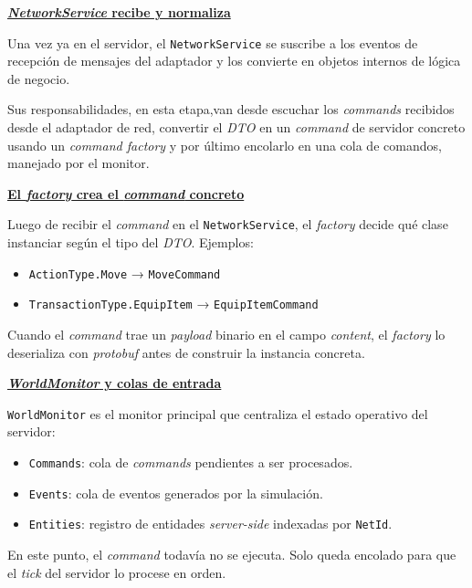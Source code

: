 \vspace{0.20cm}

\textbf{\underline{\textit{NetworkService} recibe y normaliza}}

\vspace{0.15cm}

Una vez ya en el servidor, el \texttt{NetworkService} se suscribe a los eventos de recepción de mensajes del adaptador y los 
convierte en objetos internos de lógica de negocio. 

Sus responsabilidades, en esta etapa,van desde escuchar los 
\textit{commands} recibidos desde el adaptador de red, convertir el \textit{DTO} en un \textit{command} de servidor 
concreto usando un \textit{command factory} y por último encolarlo en una cola de comandos, manejado por el monitor.

\vspace{0.25cm}

\textbf{\underline{El \textit{factory} crea el \textit{command} concreto}}

\vspace{0.15cm}

Luego de recibir el \textit{command} en el \texttt{NetworkService}, el \textit{factory} decide qué clase instanciar 
según el tipo del \textit{DTO}. Ejemplos:
\begin{itemize}
    \item \texttt{ActionType.Move} → \texttt{MoveCommand}
    \item \texttt{TransactionType.EquipItem} → \texttt{EquipItemCommand}
\end{itemize}
Cuando el \textit{command} trae un \textit{payload} binario en el campo \textit{content}, el \textit{factory} lo deserializa con 
\textit{protobuf} antes de construir la instancia concreta.

\vspace{0.25cm}

\textbf{\underline{\textit{WorldMonitor} y colas de entrada}}

\vspace{0.15cm}

\texttt{WorldMonitor} es el monitor principal que centraliza el estado operativo del servidor:
\begin{itemize}
    \item \texttt{Commands}: cola de \textit{commands} pendientes a ser procesados.
    \item \texttt{Events}: cola de eventos generados por la simulación.
    \item \texttt{Entities}: registro de entidades \textit{server-side} indexadas por \texttt{NetId}.
\end{itemize}
En este punto, el \textit{command} todavía no se ejecuta. Solo queda encolado para que el \textit{tick} del servidor 
lo procese en orden.


